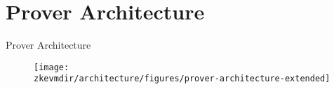 
\section{Prover Architecture}
\begin{frame}{Prover Architecture}
\begin{figure}
\texttt{[image: \\zkevmdir/architecture/figures/prover-architecture-extended]}
\end{figure}
\end{frame}